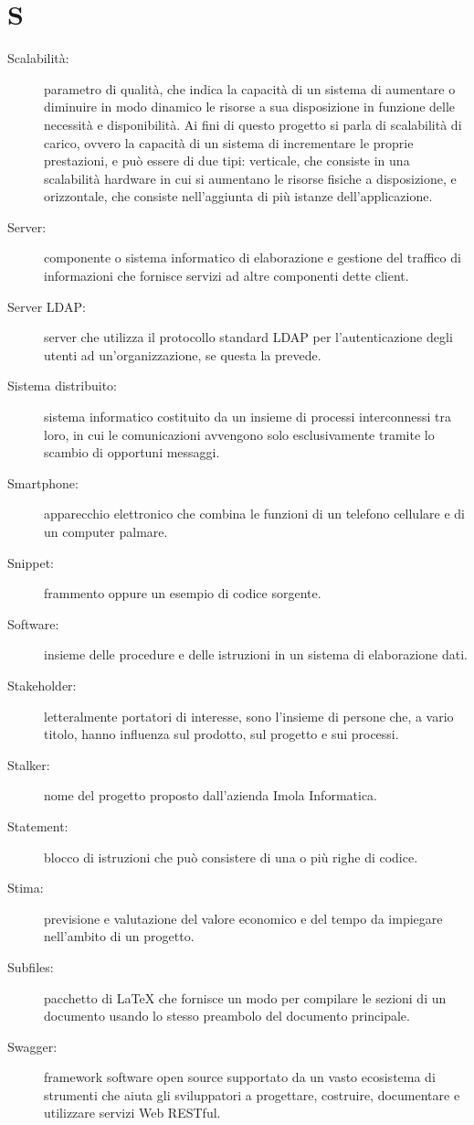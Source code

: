 \documentclass{article}
\begin{document}
\section{S}
\begin{description}
  \item[Scalabilità:] parametro di qualità, che indica la capacità di un sistema di aumentare o diminuire in modo dinamico le risorse a sua disposizione in funzione delle necessità e disponibilità. Ai fini di questo progetto si parla di scalabilità di carico, ovvero la capacità di un sistema di incrementare le proprie prestazioni, e può essere di due tipi: verticale, che consiste in una scalabilità hardware in cui si aumentano le risorse fisiche a disposizione, e orizzontale, che consiste nell'aggiunta di più istanze dell'applicazione.
  \item[Server:] componente o sistema informatico di elaborazione e gestione del traffico di informazioni che fornisce servizi ad altre componenti dette client.
  \item[Server LDAP:] server che utilizza il protocollo standard LDAP per l'autenticazione degli utenti ad un'organizzazione, se questa la prevede.
  \item[Sistema distribuito:] sistema informatico costituito da un insieme di processi interconnessi tra loro, in cui le comunicazioni avvengono solo esclusivamente tramite lo scambio di opportuni messaggi.
  \item[Smartphone:] apparecchio elettronico che combina le funzioni di un telefono cellulare e di un computer palmare.
  \item[Snippet:] frammento oppure un esempio di codice sorgente.
  \item[Software:] insieme delle procedure e delle istruzioni in un sistema di elaborazione dati.
  \item[Stakeholder:] letteralmente portatori di interesse, sono l’insieme di persone che, a vario titolo, hanno influenza sul prodotto, sul progetto e sui processi.
  \item[Stalker:] nome del progetto proposto dall'azienda Imola Informatica.
  \item[Statement:] blocco di istruzioni che può consistere di una o più righe di codice.
  \item[Stima:] previsione e valutazione del valore economico e del tempo da impiegare nell'ambito di un progetto.
  \item[Subfiles:] pacchetto di LaTeX che fornisce un modo per compilare le sezioni di un documento usando lo stesso preambolo del documento principale.
  \item[Swagger:] framework software open source supportato da un vasto ecosistema di strumenti che aiuta gli sviluppatori a progettare, costruire, documentare e utilizzare servizi Web RESTful.

\end{description}
\newpage
\end{document}
